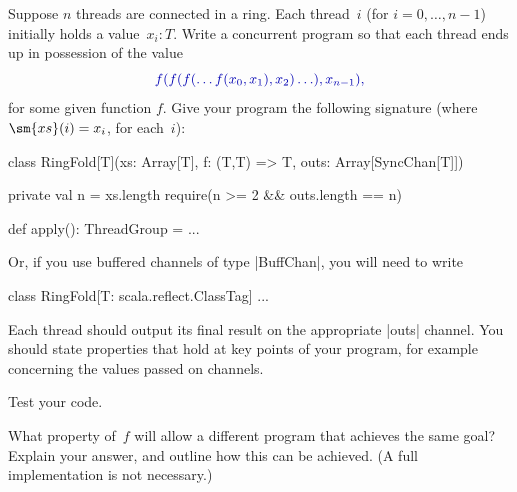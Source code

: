 \begin{question}
\label{ex:ringFold}
Suppose $n$ threads are connected in a ring.  Each thread~$i$ (for $i = 0,
\ldots, n-1$) initially holds a value~$x_i: T$.  Write a concurrent program so
that each thread ends up in possession of the value
\[\mstyle
f(f(f(\ldots f(x_0, x_1), x_2) \ldots ), x_{n-1}),
\]
for some given function $f$.
Give your program the following signature (where $\sm{xs}(i) = x_i$, for
each~$i$):
%
\begin{scala}
class RingFold[T](xs: Array[T], f: (T,T) => T, outs: Array[SyncChan[T]]){  
  private val n = xs.length
  require(n >= 2 && outs.length == n)

  def apply(): ThreadGroup = ...
}
\end{scala}
%
\noindent
Or, if you use buffered channels of type |BuffChan|, you will need to write 
\begin{scala}
class RingFold[T: scala.reflect.ClassTag] ...
\end{scala}
%
Each thread should output its final result on the appropriate |outs| channel.
You should state properties that hold at key points of your program, for
example concerning the values passed on channels.

Test your code. 

What property of~$f$ will allow a different program that achieves the same
goal?  Explain your answer, and outline how this can be achieved.  (A full
implementation is not necessary.)
\end{question}


